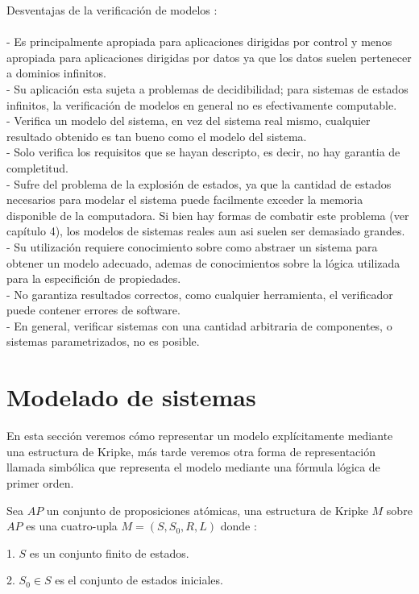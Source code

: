 Desventajas de la verificación de modelos \cite{Baier:2}:\\
\\
- Es principalmente apropiada para aplicaciones dirigidas por control y menos apropiada para aplicaciones dirigidas por datos ya que los datos suelen pertenecer a dominios infinitos.\\
- Su aplicación esta sujeta a problemas de decidibilidad; para sistemas de estados infinitos, la verificación de modelos en general no es efectivamente computable.\\
- Verifica un modelo del sistema, en vez del sistema real mismo, cualquier resultado obtenido es tan bueno como el modelo del sistema.\\
- Solo verifica los requisitos que se hayan descripto, es decir, no hay garantia de completitud.\\
- Sufre del problema de la explosión de estados, ya que la cantidad de estados necesarios para modelar el sistema puede facilmente exceder la memoria disponible de la computadora. Si bien hay formas de combatir este problema (ver capítulo 4), los modelos de sistemas reales aun asi suelen ser demasiado grandes.\\
- Su utilización requiere conocimiento sobre como abstraer un sistema para obtener un modelo adecuado, ademas de conocimientos sobre la lógica utilizada para la especifición de propiedades.\\
- No garantiza resultados correctos, como cualquier herramienta, el verificador puede contener errores de software.\\
- En general, verificar sistemas con una cantidad arbitraria de componentes, o sistemas parametrizados, no es posible.\\

\section{Modelado de sistemas}
En esta sección veremos cómo representar un modelo explícitamente mediante una estructura de Kripke, más tarde veremos otra forma de representación llamada simbólica que representa el modelo mediante una fórmula lógica de primer orden.

Sea $AP$ un conjunto de proposiciones atómicas, una estructura de Kripke $M$ sobre $AP$ es una cuatro-upla $M = (S, S_{0}, R, L)$ donde \cite{Clarke:1}:

1. $S$ es un conjunto finito de estados.

2. $S_{0} \in S$ es el conjunto de estados iniciales.

